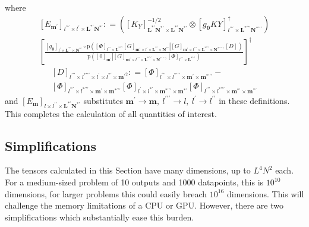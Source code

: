 \documentclass[preprint,12pt]{elsarticle}
\newcommand*{\M}[1]{\ensuremath{#1}\xspace}
\newcommand*{\x}{\times}
\newcommand*{\mi}[1]{\mathbf{#1}}
\newcommand*{\te}[2][]{\left\lbrack{#2}\right\rbrack_{#1}}
\newcommand*{\prob}[3]{\M{\mathrm{p}\!\left(\left.{#1}\right\vert{#2,#3}\right)}}
\newcommand*{\deq}{\M{\mathrel{\mathop:}=}}
\begin{document}
        where
        \begin{multline*}
            \te[l^{\prime\prime\prime}\x l^{\prime}\x \mi{L^{*\prime}N^{*\prime}}]{E_{\mi{m^{\prime}}}} \deq 
            \left(
                \te[\mi{L^{*\prime}N^{*\prime}}\x\mi{L^{*\prime}N^{*\prime}}]{K_{Y}}^{-1/2} \otimes \te[l^{\prime\prime\prime}\x\mi{L^{*\prime\prime\prime}N^{*\prime\prime\prime}}]{g_{\mi{0}}KY}^{\dagger} \right) \\
            \left\lbrack\frac{
            \te[l^{\prime}\x\mi{L^{*\prime}}\x\mi{N^{*\prime}}]{g_{\mi{0}}} \circ
            \prob
            {\te[l^{\prime\prime\prime}\x \mi{L^{*\prime\prime\prime}}]{\Phi} 
            \te[\mi{m^{\prime}}\x l^{\prime}\x \mi{L^{*\prime}\x N^{*\prime}}]{G}}
            {\te[\mi{m^{\prime}}\x l^{\prime\prime\prime}\x \mi{L^{*\prime\prime\prime}\x N^{*\prime\prime\prime}}]{G}}
            {\te[]{D}}}
            {\prob{\te[\mi{m^{\prime}}]{0}}{\te[\mi{m^{\prime}}\x l^{\prime\prime\prime}\x \mi{L^{*\prime\prime\prime}\x N^{*\prime\prime\prime}}]{G}}{\te[l^{\prime\prime\prime}\x \mi{L^{*\prime\prime\prime}}]{\Phi}}} \right\rbrack^{\dagger}
        \end{multline*}
        \begin{multline*}
            \te[l^{\prime\prime\prime} \x l^{*\prime\prime\prime}\x l^{\prime}\x l^{*\prime}\x\mi{m^{\prime}}^{2}]{D} \deq \te[l^{\prime\prime\prime}\x l^{*\prime\prime\prime}\x\mi{m^{\prime}}\x\mi{m^{*\prime\prime\prime}}]{\Phi} -  \\ 
            \te[l^{\prime\prime\prime}\x l^{*\prime\prime\prime}\x\mi{m^{\prime}}\x\mi{m^{*\prime\prime\prime}}]{\Phi}
            \te[l^{\prime}\x l^{*\prime}\x\mi{m^{*\prime\prime\prime}}\x\mi{m^{*\prime}}]{\Phi}
            \te[l^{\prime\prime\prime}\x l^{*\prime\prime\prime}\x\mi{m^{*\prime}}\x\mi{m^{\prime\prime\prime}}]{\Phi}
        \end{multline*}
        and $\te[l\x l^{\prime\prime}\x \mi{L^{*\prime}N^{*\prime}}]{E_{\mi{m}}}$ substitutes $\mi{m^{\prime}}\rightarrow\mi{m},\ l^{\prime\prime\prime}\rightarrow l,\ l^{\prime}\rightarrow l^{\prime\prime}$ in these definitions.
        This completes the calculation of all quantities of interest.

        \subsection{Simplifications}\label{sub:GPEst:Simp}
        The tensors calculated in this Section have many dimensions, up to $L^{4}N^{2}$ each. For a medium-sized problem of 10 outputs and 1000 datapoints, this is $10^{10}$ dimensions, for larger problems this could easily breach $10^{16}$ dimensions. This will challenge the memory limitations of a CPU or GPU. However, there are two simplifications which substantially ease this burden.
\end{document}

